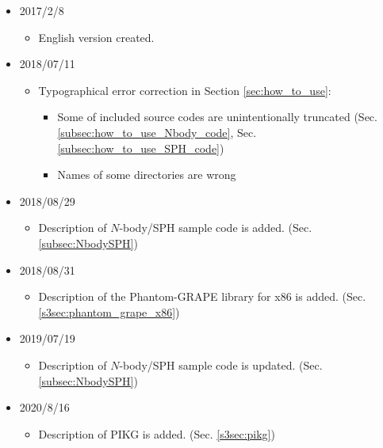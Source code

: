 \begin{itemize}
\item 2017/2/8
  \begin{itemize}
  \item English version created.
  \end{itemize}
\item 2018/07/11
  \begin{itemize}
  \item Typographical error correction in Section \ref{sec:how_to_use}:
    \begin{itemize}
    \item Some of included source codes are unintentionally truncated (Sec. \ref{subsec:how_to_use_Nbody_code}, Sec. \ref{subsec:how_to_use_SPH_code})
    \item Names of some directories are wrong
    \end{itemize}
  \end{itemize}
\item 2018/08/29
  \begin{itemize}
  \item Description of $N$-body/SPH sample code is added. (Sec. \ref{subsec:NbodySPH})
  \end{itemize}
\item 2018/08/31
  \begin{itemize}
  \item Description of the Phantom-GRAPE library for x86 is added. (Sec. \ref{s3sec:phantom_grape_x86})
  \end{itemize}
\item 2019/07/19
  \begin{itemize}
  \item Description of $N$-body/SPH sample code is updated. (Sec. \ref{subsec:NbodySPH})
  \end{itemize}
\item 2020/8/16
  \begin{itemize}
  \item Description of PIKG is added. (Sec. \ref{s3sec:pikg})
  \end{itemize}
\end{itemize}
